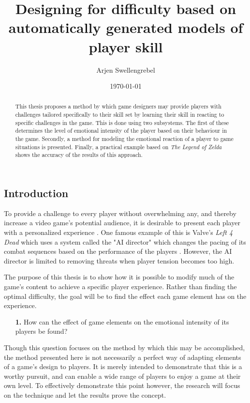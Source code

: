 \documentclass[a4paper]{article}
\title{Designing for difficulty based on automatically generated models of player skill}
\author{Arjen Swellengrebel}
\date{\today}
\begin{document}
\maketitle

\begin{multicols*}{2}
\begin{abstract}
This thesis proposes a method by which game designers may provide players with challenges tailored specifically to their skill set by learning their skill in reacting to specific challenges in the game.
This is done using two subsystems. The first of these determines the level of emotional intensity of the player based on their behaviour in the game.
Secondly, a method for modeling the emotional reaction of a player to game situations is presented.
Finally, a practical example based on \emph{The Legend of Zelda} shows the accuracy of the results of this approach.
\end{abstract}

\section{Introduction}
To provide a challenge to every player without overwhelming any, and thereby increase a video game's potential audience, it is desirable to present each player with a personalized experience \cite{playercentered}. One famous example of this is Valve's \emph{Left 4 Dead} which uses a system called the "AI director" which changes the pacing of its combat sequences based on the performance of the players \cite{left4dead}. However, the AI director is limited to removing threats when player tension becomes too high.

The purpose of this thesis is to show how it is possible to modify much of the game's content to achieve a specific player experience. Rather than finding the optimal difficulty, the goal will be to find the effect each game element has on the experience. 
\begin{itemize} \item[\textbf{1.}] How can the effect of game elements on the emotional intensity of its players be found? \end{itemize}
Though this question focuses on the method by which this may be accomplished, the method presented here is not necessarily a perfect way of adapting elements of a game's design to players. It is merely intended to demonstrate that this is a worthy pursuit, and can enable a wide range of players to enjoy a game at their own level. To effectively demonstrate this point however, the research will focus on the technique and let the results prove the concept.


\end{multicols*}
\end{document}
